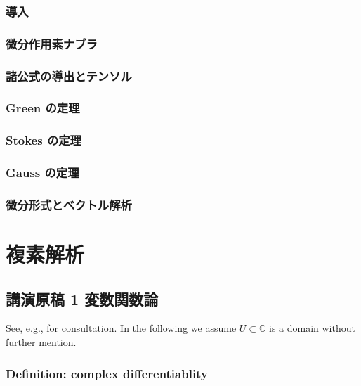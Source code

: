 \documentclass[openany, a4paper, oneside]{jsbook}
\theoremstyle{break}
\theoremstyle{breakdefn}
\newcommand{\bbC}{\mathbb{C}}
\begin{document}
\section{導入}

\section{微分作用素ナブラ}

\section{諸公式の導出とテンソル}

\section{Green の定理}

\section{Stokes の定理}

\section{Gauss の定理}

\section{微分形式とベクトル解析}

\part{複素解析}

\chapter{講演原稿 1 変数関数論}


See, e.g., \cite{MitsuoSugiura2} for consultation.
In the following we assume $U \subset \bbC$ is a domain without further mention.
\section{Definition: complex differentiablity}
\end{document}
